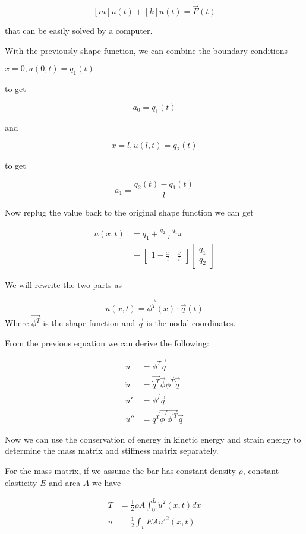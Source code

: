 \documentclass[11pt]{article}
\begin{document}
$$[m]\ddot{u}(t) + [k]u(t) = \vec{F}(t)$$

that can be easily solved by a computer.

With the previously shape function, we can combine the boundary conditions

$x=0, u(0,t) = q_1(t)$

to get  

$$a_0 = q_1(t)$$

and

$$ x = l, u(l,t) = q_2(t)$$

to get

$$a_1 = \frac{q_2(t) - q_1(t)}{l}$$

Now replug the value back to the original shape function we can get

$$ \begin{align} u(x,t) & = q_1 + \frac{q_2 - q_1}{l} x \\ & = \begin{bmatrix} 1- \frac{x}{l} & \frac{x}{l} \end{bmatrix} \begin{bmatrix} q_1 \\ q_2 \end{bmatrix} \end{align}$$

We will rewrite the two parts as

$$u(x,t) = \vec{\phi^T}(x) \cdot \vec{q}(t) $$
Where $\vec{\phi^T}$ is the shape function and $\vec{q}$ is the nodal coordinates.

From the previous equation we can derive the following:

$$\begin{align} \dot{u} &= \phi^T \vec{\dot{q}} \\ \ddot{u} &= \vec{\dot{q}^T} \vec{\phi}\vec{\phi^T} \vec{\dot{q}} \\ u' & = \vec{\phi'} \vec{q} \\u'' &= \vec{q^T} \vec{\phi^\prime} {\vec{\phi^{\prime T}}}  \vec{q} \end{align}  $$

Now we can use the conservation of energy in kinetic energy and strain energy to determine the mass matrix and stiffness matrix separately.

For the mass matrix, if we assume the bar has constant density $\rho$, constant elasticity $E$  and area $A$ we have

$$\begin{align}T &= \frac{1}{2} \rho A \int_{0}^{L} \dot{u}^2 (x,t)dx  \\ u &= \frac{1}{2} \int_v EA {u'}^2(x,t)\end{align}$$
\end{document}
